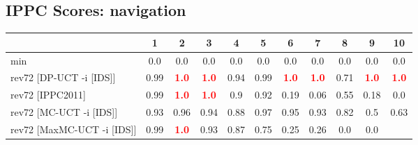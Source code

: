 \documentclass{article}
\begin{document}
\bigskip

\subsection*{IPPC Scores: navigation}

\begin{tabular}{|l|r@{$\pm$}rr@{$\pm$}rr@{$\pm$}rr@{$\pm$}rr@{$\pm$}rr@{$\pm$}rr@{$\pm$}rr@{$\pm$}rr@{$\pm$}rr@{$\pm$}r|}
\hline

& \multicolumn{2}{c}{1}
& \multicolumn{2}{c}{2}
& \multicolumn{2}{c}{3}
& \multicolumn{2}{c}{4}
& \multicolumn{2}{c}{5}
& \multicolumn{2}{c}{6}
& \multicolumn{2}{c}{7}
& \multicolumn{2}{c}{8}
& \multicolumn{2}{c}{9}
& \multicolumn{2}{c|}{10}
\\
\hline
\hline
min
& \multicolumn{2}{c}{0.0}
& \multicolumn{2}{c}{0.0}
& \multicolumn{2}{c}{0.0}
& \multicolumn{2}{c}{0.0}
& \multicolumn{2}{c}{0.0}
& \multicolumn{2}{c}{0.0}
& \multicolumn{2}{c}{0.0}
& \multicolumn{2}{c}{0.0}
& \multicolumn{2}{c}{0.0}
& \multicolumn{2}{c|}{0.0}
\\
rev72 [DP-UCT -i [IDS]]
& \multicolumn{2}{c}{0.99}
& \multicolumn{2}{c}{\textbf{\textcolor{red}{1.0}}}
& \multicolumn{2}{c}{\textbf{\textcolor{red}{1.0}}}
& \multicolumn{2}{c}{0.94}
& \multicolumn{2}{c}{0.99}
& \multicolumn{2}{c}{\textbf{\textcolor{red}{1.0}}}
& \multicolumn{2}{c}{\textbf{\textcolor{red}{1.0}}}
& \multicolumn{2}{c}{0.71}
& \multicolumn{2}{c}{\textbf{\textcolor{red}{1.0}}}
& \multicolumn{2}{c|}{\textbf{\textcolor{red}{1.0}}}
\\
rev72 [IPPC2011]
& \multicolumn{2}{c}{0.99}
& \multicolumn{2}{c}{\textbf{\textcolor{red}{1.0}}}
& \multicolumn{2}{c}{\textbf{\textcolor{red}{1.0}}}
& \multicolumn{2}{c}{0.9}
& \multicolumn{2}{c}{0.92}
& \multicolumn{2}{c}{0.19}
& \multicolumn{2}{c}{0.06}
& \multicolumn{2}{c}{0.55}
& \multicolumn{2}{c}{0.18}
& \multicolumn{2}{c|}{0.0}
\\
rev72 [MC-UCT -i [IDS]]
& \multicolumn{2}{c}{0.93}
& \multicolumn{2}{c}{0.96}
& \multicolumn{2}{c}{0.94}
& \multicolumn{2}{c}{0.88}
& \multicolumn{2}{c}{0.97}
& \multicolumn{2}{c}{0.95}
& \multicolumn{2}{c}{0.93}
& \multicolumn{2}{c}{0.82}
& \multicolumn{2}{c}{0.5}
& \multicolumn{2}{c|}{0.63}
\\
rev72 [MaxMC-UCT -i [IDS]]
& \multicolumn{2}{c}{0.99}
& \multicolumn{2}{c}{\textbf{\textcolor{red}{1.0}}}
& \multicolumn{2}{c}{0.93}
& \multicolumn{2}{c}{0.87}
& \multicolumn{2}{c}{0.75}
& \multicolumn{2}{c}{0.25}
& \multicolumn{2}{c}{0.26}
& \multicolumn{2}{c}{0.0}
& \multicolumn{2}{c}{0.0}

\end{tabular}
\end{document}
